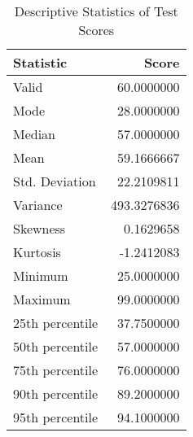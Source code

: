 \documentclass[
]{article}
\begin{document}
\begin{table}

\caption{\label{tab:unnamed-chunk-6}Descriptive Statistics of Test Scores}
\centering
\begin{tabular}[t]{lr}
\toprule
Statistic & Score\\
\midrule
Valid & 60.0000000\\
Mode & 28.0000000\\
Median & 57.0000000\\
Mean & 59.1666667\\
Std. Deviation & 22.2109811\\
\addlinespace
Variance & 493.3276836\\
Skewness & 0.1629658\\
Kurtosis & -1.2412083\\
Minimum & 25.0000000\\
Maximum & 99.0000000\\
\addlinespace
25th percentile & 37.7500000\\
50th percentile & 57.0000000\\
75th percentile & 76.0000000\\
90th percentile & 89.2000000\\
95th percentile & 94.1000000\\
\bottomrule
\end{tabular}
\end{table}
\end{document}
